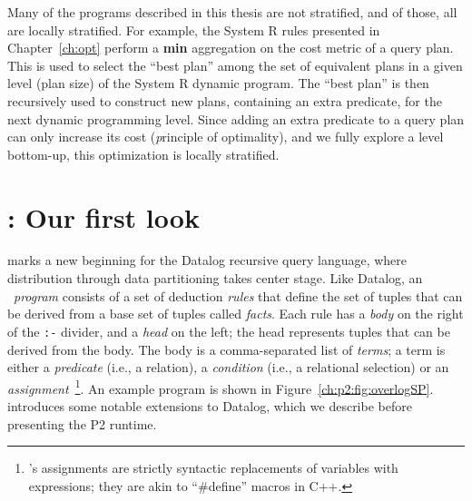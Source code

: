 Many of the programs described in this thesis are not stratified, and of those,
all are locally stratified.  For example, the System R rules presented in
Chapter~\ref{ch:opt} perform a {\bf min} aggregation on the cost metric of a
query plan.  This is used to select the ``best plan'' among the set of
equivalent plans in a given level (plan size) of the System R dynamic program.
The ``best plan'' is then recursively used to construct new plans, containing
an extra predicate, for the next dynamic programming level.  Since adding an
extra predicate to a query plan can only increase its cost ({\emph principle of
optimality}), and we fully explore a level bottom-up, this optimization is locally
stratified.


\section{\OVERLOG: Our first look}
\label{ch:p2:sec:overlog}

\OVERLOG marks a new beginning for the Datalog recursive query language, where
distribution through data partitioning takes center stage.  Like Datalog, an
\OVERLOG~{\em program} consists of a set of deduction {\em rules} that define
the set of tuples that can be derived from a base set of tuples called {\em
facts}.  Each rule has a {\em body} on the right of the \texttt{:-} divider,
and a {\em head} on the left; the head represents tuples that can be derived
from the body.  The body is a comma-separated list of {\em terms}; a term is
either a {\em predicate} (i.e., a relation), a {\em condition} (i.e., a
relational selection) or an {\em assignment}~\footnote{\OVERLOG's assignments
are strictly syntactic replacements of variables with expressions; they are
akin to ``\#define'' macros in C++.}.  An example \OVERLOG program is shown in
Figure~\ref{ch:p2:fig:overlogSP}.  \OVERLOG introduces some notable extensions
to Datalog, which we describe before presenting the P2 runtime.

